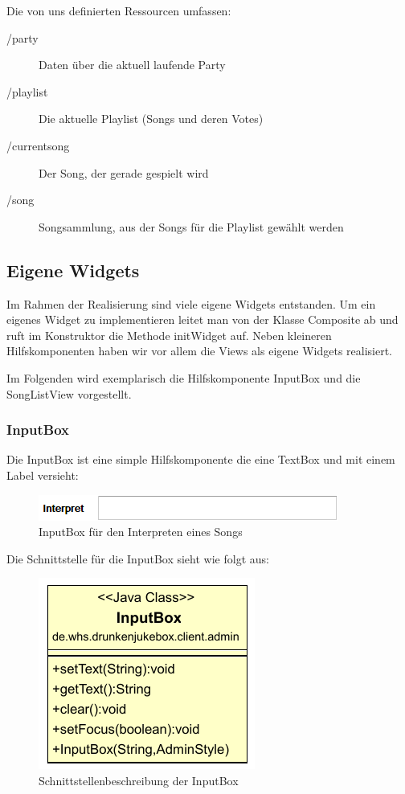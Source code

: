 Die von uns definierten Ressourcen umfassen:
\begin{description}
	\item[/party] Daten über die aktuell laufende Party
	\item[/playlist] Die aktuelle Playlist (Songs und deren Votes)
	\item[/currentsong] Der Song, der gerade gespielt wird
	\item[/song] Songsammlung, aus der Songs für die Playlist gewählt werden
\end{description}

\subsection{Eigene Widgets}
Im Rahmen der Realisierung sind viele eigene Widgets entstanden. Um ein eigenes Widget zu implementieren leitet man von der Klasse Composite ab und ruft im Konstruktor die Methode initWidget auf. Neben kleineren Hilfskomponenten haben wir vor allem die Views als eigene Widgets realisiert.

Im Folgenden wird exemplarisch die Hilfskomponente InputBox und die SongListView vorgestellt.

\subsubsection{InputBox}
Die InputBox ist eine simple Hilfskomponente die eine TextBox und mit einem Label versieht:

\begin{figure}[H]
\centering
\includegraphics[width=0.7\linewidth]{Bilder/InputBox}
\caption{InputBox für den Interpreten eines Songs}
\label{fig:InputBox}
\end{figure}

Die Schnittstelle für die InputBox sieht wie folgt aus:
\begin{figure}[H]
\centering
\includegraphics[width=0.4\linewidth]{Bilder/InputBoxClass}
\caption{Schnittstellenbeschreibung der InputBox}
\label{fig:InputBoxClass}
\end{figure}





